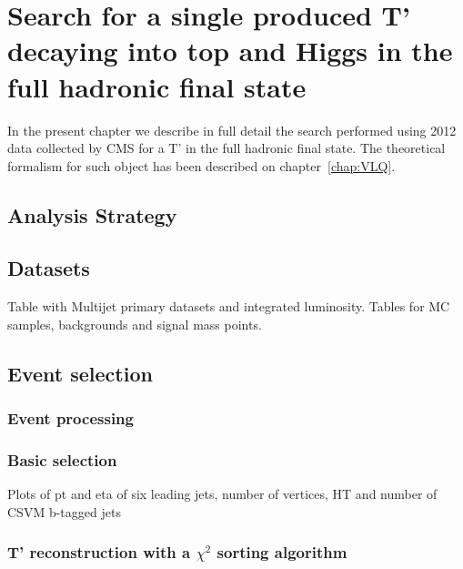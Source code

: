 \chapter[Single VLQ search]{Search for a single produced T' decaying into top and Higgs in the full hadronic final state}
\label{chap:search}

In the present chapter we describe in full detail the search performed using 2012 data collected by CMS for a T' in the full hadronic final state. The theoretical formalism for such object has been described on chapter~\ref{chap:VLQ}.

\section{Analysis Strategy}
\label{sec:stra}

\section{Datasets}
\label{sec:data}

\begin{TOINCLUDE}Table with Multijet primary datasets and integrated luminosity. Tables for MC samples, backgrounds and signal mass points.\end{TOINCLUDE}

\section{Event selection}
\label{sec:sel}

\subsection{Event processing}

\subsection{Basic selection}

\begin{TOINCLUDE}Plots of pt and eta of six leading jets, number of vertices, HT and number of CSVM b-tagged jets\end{TOINCLUDE}

\subsection{T' reconstruction with a $\chi^{2}$ sorting algorithm}
\label{sec:chi2}

